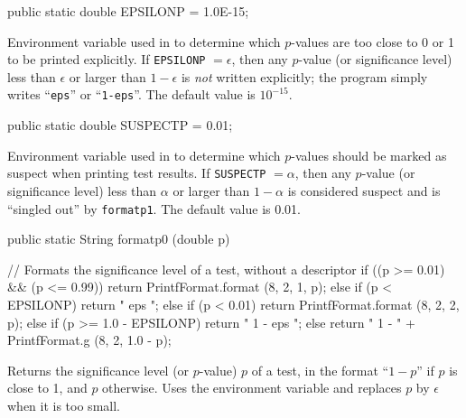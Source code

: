 \begin{code}

   public static double EPSILONP = 1.0E-15;
\end{code}
 \begin{tabb}  Environment variable used in  to determine
   which $p$-values are too close to 0 or 1 to be printed explicitly.
   If \texttt{EPSILONP} $= \epsilon$, then any $p$-value
   (or significance level) less than $\epsilon$ or larger than
   $1-\epsilon$ is {\em not\/} written explicitly;
   the program simply writes ``\texttt{eps}'' or ``\texttt{1-eps}''.
   The default value is $10^{-15}$.
 \end{tabb}
\begin{code}

   public static double SUSPECTP = 0.01;
\end{code}
 \begin{tabb}  Environment variable used in  to determine
   which $p$-values should be marked as suspect when printing test results.
   If \texttt{SUSPECTP} $= \alpha$, then any $p$-value
   (or significance level) less than $\alpha$ or larger than
   $1-\alpha$ is considered suspect and is
   ``singled out'' by \texttt{formatp1}.
   The default value is 0.01.
 \end{tabb}
\begin{code}

   public static String formatp0 (double p)\begin{hide} {
      // Formats the significance level of a test, without a descriptor
      if ((p >= 0.01) && (p <= 0.99))
         return PrintfFormat.format (8, 2, 1, p);
      else if (p < EPSILONP)
         return "   eps  ";
      else if (p < 0.01)
         return PrintfFormat.format (8, 2, 2, p);
      else if (p >= 1.0 - EPSILONP)
         return " 1 - eps ";
      else
         return " 1 - " + PrintfFormat.g (8, 2, 1.0 - p);
   }\end{hide}
\end{code}
\begin{tabb}  Returns the significance level (or $p$-value) $p$ of a test,
   in the format ``$1-p$'' if $p$ is close to 1, and $p$ otherwise.
   Uses the environment variable   and replaces $p$
   by $\epsilon$ when it is too small.
\end{tabb}
